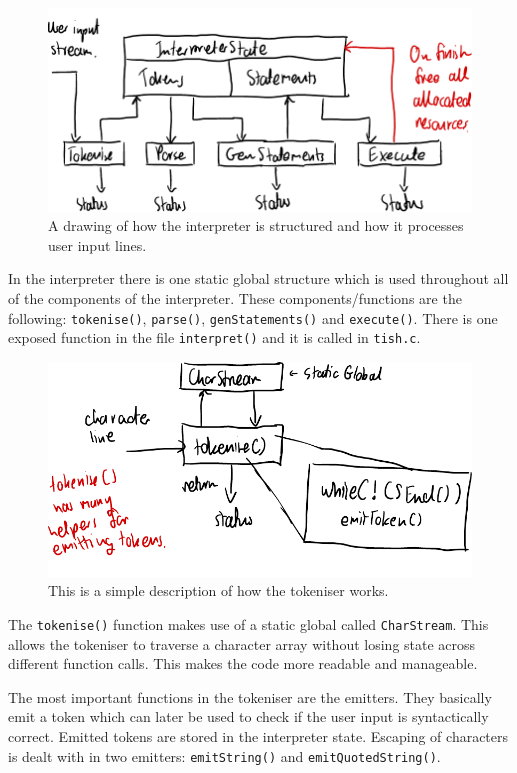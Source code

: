 \documentclass[12pt]{article}
\begin{document}
\begin{figure}[H]
\centering
\includegraphics{interpreter-arch}
\caption{A drawing of how the interpreter is structured and how
it processes user input lines.}
\end{figure}

In the interpreter there is one static global structure which is
used throughout all of the components of the interpreter. These
components/functions are the following: \texttt{tokenise()},
\texttt{parse()}, \texttt{genStatements()} and
\texttt{execute()}. There is one exposed function in the file
\texttt{interpret()} and it is called in \texttt{tish.c}.

\begin{figure}[H]
\centering
\includegraphics{tokeniser}
\caption{This is a simple description of how the
tokeniser works.}
\end{figure}

The \texttt{tokenise()} function makes use of a static global
called \texttt{CharStream}. This allows the tokeniser to
traverse a character array without losing state across different
function calls. This makes the code more readable and
manageable.

The most important functions in the tokeniser are the emitters.
They basically emit a token which can later be used to check if
the user input is syntactically correct. Emitted tokens are
stored in the interpreter state. Escaping of characters is dealt
with in two emitters: \texttt{emitString()} and
\texttt{emitQuotedString()}.
\end{document}
